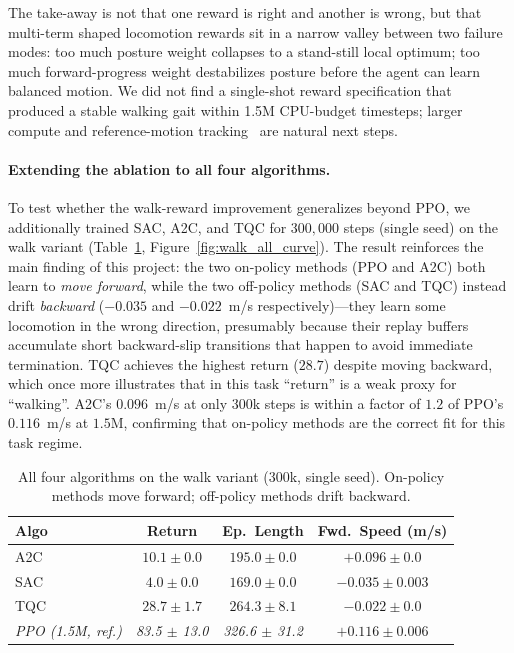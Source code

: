 \documentclass[letterpaper]{article}
\begin{document}
The take-away is not that one reward is right and another is wrong, but that multi-term shaped locomotion rewards sit in a narrow valley between two failure modes: too much posture weight collapses to a stand-still local optimum; too much forward-progress weight destabilizes posture before the agent can learn balanced motion. We did not find a single-shot reward specification that produced a stable walking gait within 1.5M CPU-budget timesteps; larger compute and reference-motion tracking~\citep{peng2018deepmimic} are natural next steps.

\paragraph{Extending the ablation to all four algorithms.} To test whether the walk-reward improvement generalizes beyond PPO, we additionally trained SAC, A2C, and TQC for $300{,}000$ steps (single seed) on the walk variant (Table~\ref{tab:walk_all}, Figure~\ref{fig:walk_all_curve}). The result reinforces the main finding of this project: the two on-policy methods (PPO and A2C) both learn to \emph{move forward}, while the two off-policy methods (SAC and TQC) instead drift \emph{backward} ($-0.035$ and $-0.022$~m/s respectively)---they learn some locomotion in the wrong direction, presumably because their replay buffers accumulate short backward-slip transitions that happen to avoid immediate termination. TQC achieves the highest return ($28.7$) despite moving backward, which once more illustrates that in this task ``return'' is a weak proxy for ``walking''. A2C's $0.096$~m/s at only $300$k steps is within a factor of $1.2$ of PPO's $0.116$~m/s at $1.5$M, confirming that on-policy methods are the correct fit for this task regime.

\begin{table}[t]
\centering
\small
\caption{All four algorithms on the walk variant (300k, single seed). On-policy methods move forward; off-policy methods drift backward.}
\label{tab:walk_all}
\begin{tabular}{lccc}
\toprule
Algo & Return & Ep.~Length & Fwd.~Speed (m/s) \\
\midrule
A2C & $10.1 \pm 0.0$ & $195.0 \pm 0.0$ & $\mathbf{+0.096 \pm 0.0}$ \\
SAC & $4.0 \pm 0.0$ & $169.0 \pm 0.0$ & $-0.035 \pm 0.003$ \\
TQC & $\mathbf{28.7 \pm 1.7}$ & $264.3 \pm 8.1$ & $-0.022 \pm 0.0$ \\
\midrule
\emph{PPO (1.5M, ref.)} & \emph{83.5 $\pm$ 13.0} & \emph{326.6 $\pm$ 31.2} & \emph{$\mathbf{+0.116 \pm 0.006}$} \\
\bottomrule
\end{tabular}
\end{table}
\end{document}
